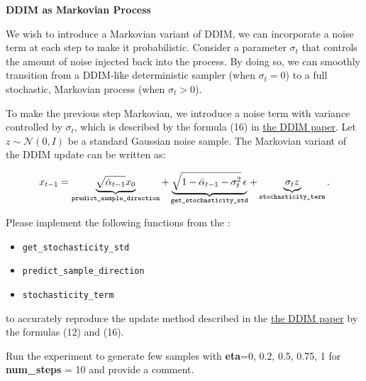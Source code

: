  \textbf{DDIM as Markovian Process}

We wish to introduce a Markovian variant of DDIM, we can incorporate a noise term at each step to make it probabilistic. 
Consider a parameter $\sigma_t$ that controls the amount of noise injected back into the process. By doing so, we can smoothly transition 
from a DDIM-like deterministic sampler (when $\sigma_t=0$) to a full stochastic, Markovian process (when $\sigma_t>0$).


To make the previous step Markovian, we introduce a noise term with variance controlled by $\sigma_t$, which is described by the formula (16) 
in \href{https://arxiv.org/pdf/2010.02502}{the DDIM paper}. Let $z \sim \mathcal{N}(0,I)$ be a standard Gaussian noise sample. 
The Markovian variant of the DDIM update can be written as:

\[
x_{t-1} =
\underbrace{\sqrt{\bar{\alpha}_{t-1}} x_0}_{\text{\texttt{predict\_sample\_direction}}} 
+ 
\underbrace{\sqrt{1 - \bar{\alpha}_{t-1} - \sigma_t^2}\,\epsilon}_{\text{\texttt{get\_stochasticity\_std}}} 
+ 
\underbrace{\sigma_t z}_{\text{\texttt{stochasticity\_term}}}.
\]

Please implement the following functions from the :
\begin{itemize}
    \item \texttt{get\_stochasticity\_std}
    \item \texttt{predict\_sample\_direction}
    \item \texttt{stochasticity\_term}
\end{itemize}

to accurately reproduce the update method described in the \href{https://arxiv.org/pdf/2010.02502}{the DDIM paper} by the formulas (12) and (16).

Run the experiment to generate few samples with \textbf{eta}=0, 0.2, 0.5, 0.75, 1 for \textbf{num\_steps} = 10 and provide a comment.
